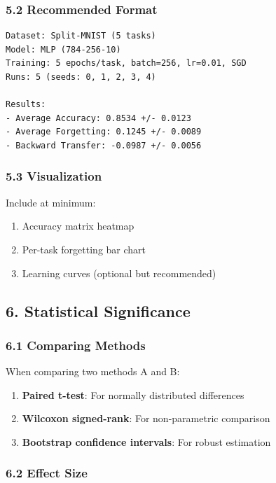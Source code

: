 \documentclass[11pt]{article}
\begin{document}
\subsubsection{5.2 Recommended Format}

\begin{Verbatim}[fontsize=\small]
Dataset: Split-MNIST (5 tasks)
Model: MLP (784-256-10)
Training: 5 epochs/task, batch=256, lr=0.01, SGD
Runs: 5 (seeds: 0, 1, 2, 3, 4)

Results:
- Average Accuracy: 0.8534 +/- 0.0123
- Average Forgetting: 0.1245 +/- 0.0089
- Backward Transfer: -0.0987 +/- 0.0056
\end{Verbatim}

\subsubsection{5.3 Visualization}

Include at minimum:

\begin{enumerate}[leftmargin=*]
\item Accuracy matrix heatmap
\item Per-task forgetting bar chart
\item Learning curves (optional but recommended)
\end{enumerate}

\subsection{6. Statistical Significance}

\subsubsection{6.1 Comparing Methods}

When comparing two methods A and B:

\begin{enumerate}[leftmargin=*]
\item \textbf{Paired t-test}: For normally distributed differences
\item \textbf{Wilcoxon signed-rank}: For non-parametric comparison
\item \textbf{Bootstrap confidence intervals}: For robust estimation
\end{enumerate}

\subsubsection{6.2 Effect Size}
\end{document}
